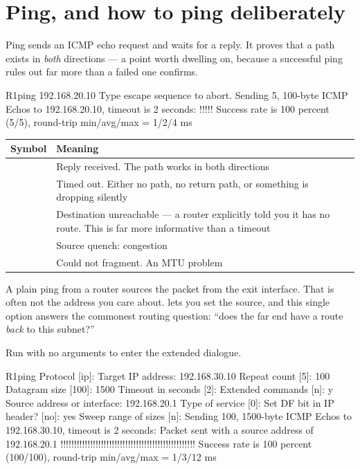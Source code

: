 \section{Ping, and how to ping deliberately}

Ping sends an ICMP echo request and waits for a reply. It proves that a path
exists in \emph{both} directions --- a point worth dwelling on, because a
successful ping rules out far more than a failed one confirms.

\begin{verify}{R1}{ping 192.168.20.10}
Type escape sequence to abort.
Sending 5, 100-byte ICMP Echos to 192.168.20.10, timeout is 2 seconds:
!!!!!
Success rate is 100 percent (5/5), round-trip min/avg/max = 1/2/4 ms
\end{verify}

\begin{longtable}{@{}C{1.6cm}L{13.6cm}@{}}
\toprule
{}
\textbf{Symbol} & \textbf{Meaning} \\
\midrule
\endhead
\cmd{!} & Reply received. The path works in both directions \\
 & Timed out. Either no path, no return path, or something is dropping
silently \\
 & Destination unreachable --- a router explicitly told you it has no
route. This is far more informative than a timeout \\
 & Source quench: congestion \\
 & Could not fragment. An MTU problem \\
\bottomrule
\end{longtable}

\begin{conceptbox}
A plain ping from a router sources the packet from the exit interface. That is
often not the address you care about.  lets you set the
source, and this single option answers the commonest routing question: ``does the
far end have a route \emph{back} to this subnet?''

Run  with no arguments to enter the extended dialogue.
\end{conceptbox}

\begin{verify}{R1}{ping}
Protocol [ip]:
Target IP address: 192.168.30.10
Repeat count [5]: 100
Datagram size [100]: 1500
Timeout in seconds [2]:
Extended commands [n]: y
Source address or interface: 192.168.20.1
Type of service [0]:
Set DF bit in IP header? [no]: yes
Sweep range of sizes [n]:
Sending 100, 1500-byte ICMP Echos to 192.168.30.10, timeout is 2 seconds:
Packet sent with a source address of 192.168.20.1
!!!!!!!!!!!!!!!!!!!!!!!!!!!!!!!!!!!!!!!!!!!!!!!!!!
Success rate is 100 percent (100/100), round-trip min/avg/max = 1/3/12 ms
\end{verify}


